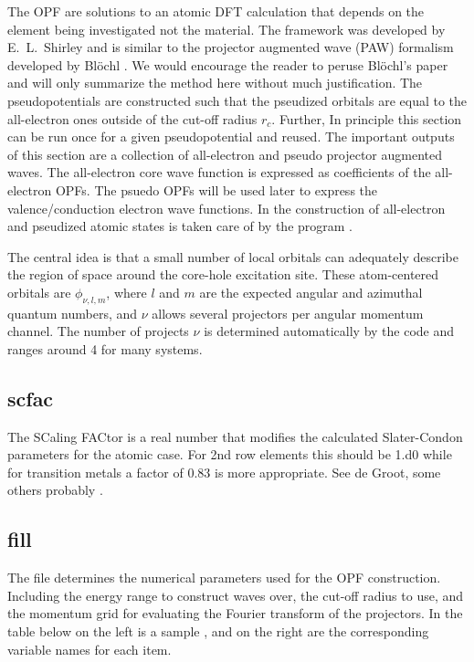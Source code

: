 \documentclass[11pt]{report}
\begin{document}
The OPF are solutions to an atomic DFT calculation that depends on the element being investigated not the material. 
The framework was developed by E.\ L.\ Shirley \cite{ShirleyOPF} and is similar to the projector augmented wave (PAW) formalism developed by Bl\"{o}chl \cite{PhysRevB.50.17953}. 
%
We would encourage the reader to peruse Bl\"{o}chl's paper and will only summarize the method here without much justification.
The pseudopotentials are constructed such that the pseudized orbitals are equal to the all-electron ones outside of the cut-off radius $r_c$. 
Further,  
In principle this section can be run once for a given pseudopotential and reused. 
The important outputs of this section are a collection of all-electron and pseudo projector augmented waves. 
The all-electron core wave function is expressed as coefficients of the all-electron OPFs. 
The psuedo OPFs will be used later to express the valence/conduction electron wave functions.
%
In  
the construction of all-electron and pseudized atomic states is taken care of by the program . 

The central idea is that a small number of local orbitals can adequately describe the region of space around the 
core-hole excitation site. These atom-centered orbitals are $\phi_{\nu,l,m}$, where $l$ and $m$ are the 
expected angular and azimuthal quantum numbers, and $\nu$ allows several projectors per angular momentum channel. 
The number of projects $\nu$ is determined automatically by the code and ranges around 4 for many systems. 

\subsection{scfac}
The SCaling FACtor is a real number that modifies the calculated Slater-Condon parameters for the atomic case. For 2nd row elements this should be 1.d0 while for transition metals a factor of 0.83 is more appropriate. See de Groot, some others probably \cite{degroot.book}.

\subsection{fill}
\label{fill}
The  file determines the numerical parameters used for the OPF construction. Including the energy range to construct waves over,
the cut-off radius to use, and the momentum grid for evaluating the Fourier transform of the projectors. 
In the table below on the left is a sample , and on the right are the corresponding variable names for each item.
\end{document}
